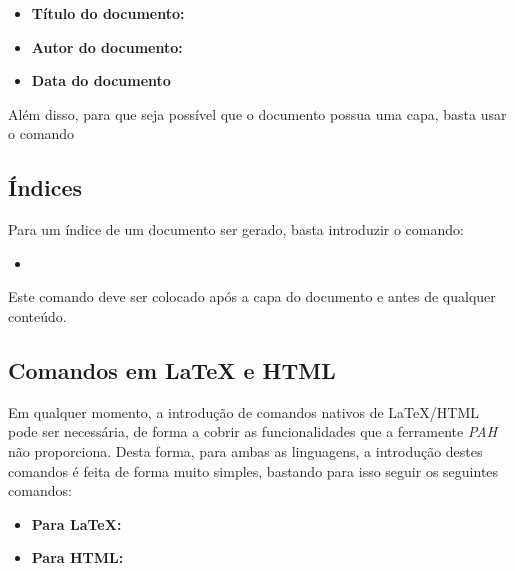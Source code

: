 \documentclass[11pt,a4paper]{article}
\begin{document}
\begin{itemize}
    \item \textbf{Título do documento:} 
        \verb@ %title Título @
    \item \textbf{Autor do documento:}
        \verb@ %author Autor @
    \item \textbf{Data do documento}
        \verb@ %date 02/04/2013 @
\end{itemize}



Além disso, para que seja possível que o documento possua uma capa, basta usar o comando \verb@ %cover% @, que em LaTeX diz respeito ao comando \verb@ \maketitle @, e em Html diz respeito a uma zona do documento, mais propriamente no início do dumento, onde terá toda esta informação. \\ 



\subsection{Índices}
Para um índice de um documento ser gerado, basta introduzir o comando:

\begin{itemize}
    \item \verb@ %index% @
\end{itemize}


Este comando deve ser colocado após a capa do documento e antes de qualquer conteúdo. \\  
 


\subsection{Comandos em LaTeX e HTML}
Em qualquer momento, a introdução de comandos nativos de LaTeX/HTML pode ser necessária, de forma a cobrir as funcionalidades que a ferramente \textit{PAH} não proporciona. Desta forma, para ambas as linguagens, a introdução destes comandos é feita de forma muito simples, bastando para isso seguir os seguintes comandos: \\  

 \begin{itemize}
    \item \textbf{Para LaTeX:} 
        \verb@ %%latex% Comandos nativos em latex %latex%% @
    \item \textbf{Para HTML:}
        \verb@ %%html% Comandos nativos em html %html%% @
\end{itemize}
\end{document}
